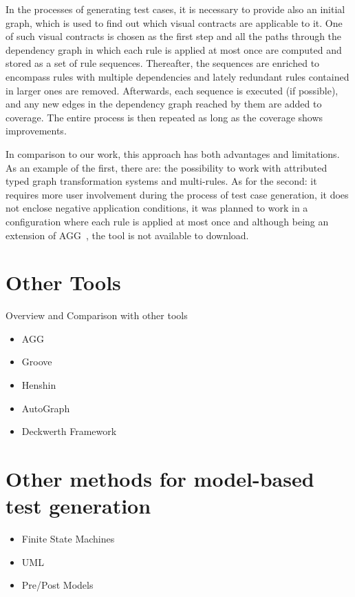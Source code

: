 In the processes of generating test cases, it is necessary to provide also an initial graph, which is used to find out which visual contracts are applicable to it. One of such visual contracts is chosen as the first step and all the paths through the dependency graph in which each rule is applied at most once are computed and stored as a set of rule sequences. Thereafter, the sequences are enriched to encompass rules with multiple dependencies and lately redundant rules contained in larger ones are
removed. Afterwards, each sequence is executed (if possible), and any new edges in the dependency graph reached by them are added to coverage. The entire process is then repeated as long as the coverage shows improvements. 

In comparison to our work, this approach has both advantages and limitations. As an example of the first, there are: the possibility to work with attributed typed graph transformation systems and multi-rules. As for the second: it requires more user involvement during the process of test case generation, it does not enclose negative application conditions, it was planned to work in a configuration where each rule is applied at most once and although being an extension of
AGG~\cite{Taentzer2000}, the tool is not available to download.

\section{Other Tools}

Overview and Comparison with other tools

\begin{itemize}
\item AGG
\item Groove
\item Henshin
\item AutoGraph
\item Deckwerth Framework
\end{itemize}

\section{Other methods for model-based test generation}

\begin{itemize}
  \item Finite State Machines
  \item UML
  \item Pre/Post Models
\end{itemize}

